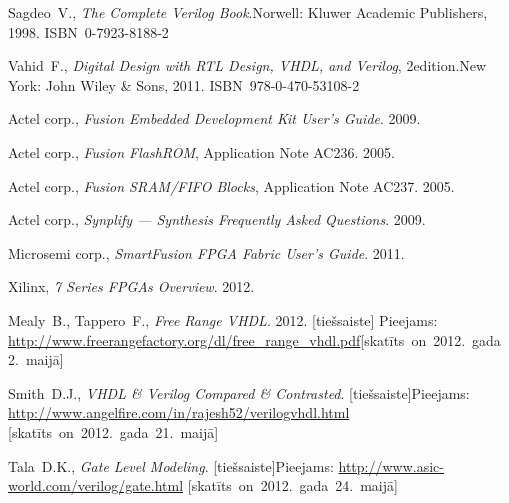 \documentclass[12pt,a4paper]{article} %
\begin{document}
{\begin{thebibliography}{99}
			Sagdeo~V.,
			\textit{The Complete Verilog Book}.\linebreak[2]
			Norwell: Kluwer Academic Publishers, 1998. ISBN~0-7923-8188-2
		
			Vahid~F.,
			\textit{Digital Design with RTL Design, VHDL, and Verilog}, 2\nd edition.\linebreak[2]
			New York: %
			John Wiley \& Sons, 2011. ISBN~978-0-470-53108-2
		
			Actel corp.,
			\textit{Fusion Embedded Development Kit User's Guide}. %
			2009.
		
			Actel corp.,
			\textit{Fusion FlashROM}, Application Note AC236. %
			2005.
		
			Actel corp.,
			\textit{Fusion SRAM/FIFO Blocks}, Application Note AC237. %
			2005.
		
			Actel corp.,
			\textit{Synplify — Synthesis Frequently Asked Questions}. %
			2009.
		
			Microsemi corp.,
			\textit{SmartFusion FPGA Fabric User's Guide}.
			2011.
		
			Xilinx,
			\textit{7 Series FPGAs Overview}.
			2012.
		
			Mealy~B., Tappero~F.,
			\textit{Free Range VHDL}.
			2012. [tiešsaiste] \linebreak[2]
			Pieejams: \url{http://www.freerangefactory.org/dl/free_range_vhdl.pdf}\linebreak[2]
			\mbox{[skatīts on 2012.~gada 2.~maijā]}
		
			Smith~D.J.,
			\textit{VHDL \& Verilog Compared \& Contrasted}. [tiešsaiste]\linebreak[2]
			Pieejams: \url{http://www.angelfire.com/in/rajesh52/verilogvhdl.html}
			\mbox{[skatīts on 2012.~gada 21.~maijā]}
		
			Tala~D.K., \textit{Gate Level Modeling}. [tiešsaiste]\linebreak[2]
			Pieejams: \url{http://www.asic-world.com/verilog/gate.html}
			\mbox{[skatīts on 2012.~gada 24.~maijā]}
	\end{thebibliography}
	} %
	
\end{document}
